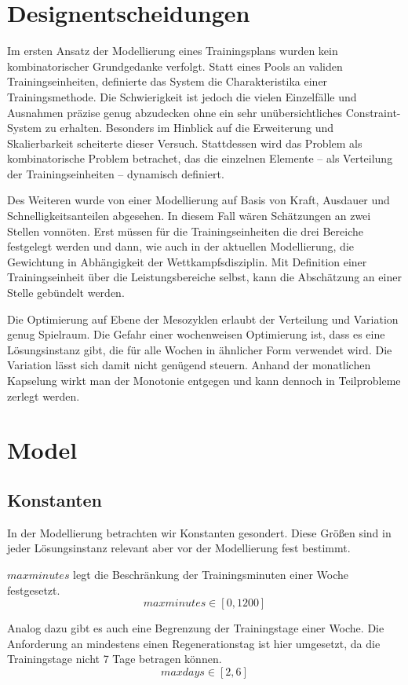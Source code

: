 \section{Designentscheidungen}
Im ersten Ansatz der Modellierung eines Trainingsplans wurden kein kombinatorischer Grundgedanke verfolgt. Statt eines Pools an validen Trainingseinheiten, definierte das System die Charakteristika einer Trainingsmethode. Die Schwierigkeit ist jedoch die vielen Einzelfälle und Ausnahmen präzise genug abzudecken ohne ein sehr unübersichtliches Constraint-System zu erhalten. Besonders im Hinblick auf die Erweiterung und Skalierbarkeit scheiterte dieser Versuch. Stattdessen wird das Problem als kombinatorische Problem betrachet, das die einzelnen Elemente -- als Verteilung der Trainingseinheiten -- dynamisch definiert. \par
Des Weiteren wurde von einer Modellierung auf Basis von Kraft, Ausdauer und Schnelligkeitsanteilen abgesehen. In diesem Fall wären Schätzungen an zwei Stellen vonnöten. Erst müssen für die Trainingseinheiten die drei Bereiche festgelegt werden und dann, wie auch in der aktuellen Modellierung, die Gewichtung in Abhängigkeit der Wettkampfsdisziplin. Mit Definition einer Trainingseinheit über die Leistungsbereiche selbst, kann die Abschätzung an einer Stelle gebündelt werden.\par
Die Optimierung auf Ebene der Mesozyklen erlaubt der Verteilung und Variation genug Spielraum. Die Gefahr einer wochenweisen Optimierung ist, dass es eine Lösungsinstanz gibt, die für alle Wochen in ähnlicher Form verwendet wird. Die Variation lässt sich damit nicht genügend steuern. Anhand der monatlichen Kapselung wirkt man der Monotonie entgegen und kann dennoch in Teilprobleme zerlegt werden.

\section{Model}
\subsection{Konstanten}
In der Modellierung betrachten wir Konstanten gesondert. Diese Größen sind in jeder Lösungsinstanz relevant aber vor der Modellierung fest bestimmt.

$maxminutes$ legt die Beschränkung der Trainingsminuten einer Woche festgesetzt.
\[ maxminutes \in [0, 1200] \]

Analog dazu gibt es auch eine Begrenzung der Trainingstage einer Woche. Die Anforderung an mindestens einen Regenerationstag ist hier umgesetzt, da die Trainingstage nicht 7 Tage betragen können.
\[ maxdays \in [2, 6] \]

